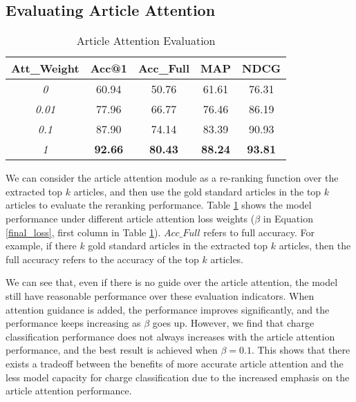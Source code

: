 \subsection{Evaluating Article Attention}
\begin{table}
\centering
\normalsize{
\begin{tabular}{|c|c|c|c|c|}
\hline
\textbf{Att\_Weight}			& \textbf{Acc@1} 			& \textbf{Acc\_Full} 			& \textbf{MAP} 			& \textbf{NDCG} \\
\hline
\textit{0} 					& 60.94					& 50.76  					& 61.61 				& 76.31 	\\
\hline
\textit{0.01} 				& 77.96					& 66.77  					& 76.46				& 86.19 	\\
\hline
\textit{0.1} 				& 87.90					& 74.14  					& 83.39				& 90.93 	\\
\hline
\textit{1} 					& \textbf{92.66}				& \textbf{80.43}  			& \textbf{88.24}			& \textbf{93.81} 	\\
\hline
\end{tabular}
}
\caption{Article Attention Evaluation}
\label{tab_article_att}
\end{table}
We can consider the article attention module as a re-ranking function over the extracted top $k$ articles, and then use the gold standard articles in the top $k$ articles to evaluate the reranking performance. Table \ref{tab_article_att} shows the model performance under different article attention loss weights ($\beta$ in Equation \ref{final_loss}, first column in Table \ref{tab_article_att}). $Acc\_Full$ refers to full accuracy. For example, if there $k$ gold standard articles in the extracted top $k$ articles, then the full accuracy refers to the accuracy of the top $k$ articles.

We can see that, even if there is no guide over the article attention, the model still have reasonable performance over these evaluation indicators. When attention guidance is added, the performance improves significantly, and the performance keeps increasing as $\beta$ goes up. However, we find that charge classification performance does not always increases with the article attention performance, and the best result is achieved when $\beta=0.1$. This shows that there exists a tradeoff between the benefits of more accurate article attention and the less model capacity for charge classification due to the increased emphasis on the article attention performance.


